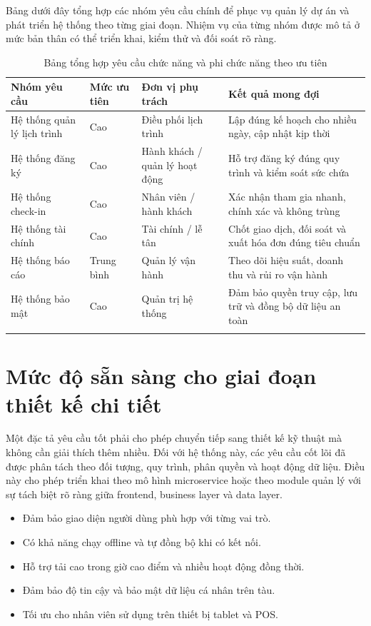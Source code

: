 Bảng dưới đây tổng hợp các nhóm yêu cầu chính để phục vụ quản lý dự án và phát triển hệ thống theo từng giai đoạn. Nhiệm vụ của từng nhóm được mô tả ở mức bản thân có thể triển khai, kiểm thử và đối soát rõ ràng.

\begin{longtable}{|p{2.7cm}|p{3.8cm}|p{3.5cm}|p{4.2cm}|}
\hline
\textbf{Nhóm yêu cầu} & \textbf{Mức ưu tiên} & \textbf{Đơn vị phụ trách} & \textbf{Kết quả mong đợi} \\
\hline
Hệ thống quản lý lịch trình & Cao & Điều phối lịch trình & Lập đúng kế hoạch cho nhiều ngày, cập nhật kịp thời \\
\hline
Hệ thống đăng ký & Cao & Hành khách / quản lý hoạt động & Hỗ trợ đăng ký đúng quy trình và kiểm soát sức chứa \\
\hline
Hệ thống check-in & Cao & Nhân viên / hành khách & Xác nhận tham gia nhanh, chính xác và không trùng \\
\hline
Hệ thống tài chính & Cao & Tài chính / lễ tân & Chốt giao dịch, đối soát và xuất hóa đơn đúng tiêu chuẩn \\
\hline
Hệ thống báo cáo & Trung bình & Quản lý vận hành & Theo dõi hiệu suất, doanh thu và rủi ro vận hành \\
\hline
Hệ thống bảo mật & Cao & Quản trị hệ thống & Đảm bảo quyền truy cập, lưu trữ và đồng bộ dữ liệu an toàn \\
\hline
\caption{Bảng tổng hợp yêu cầu chức năng và phi chức năng theo ưu tiên}
\end{longtable}

\section{Mức độ sẵn sàng cho giai đoạn thiết kế chi tiết}

Một đặc tả yêu cầu tốt phải cho phép chuyển tiếp sang thiết kế kỹ thuật mà không cần giải thích thêm nhiều. Đối với hệ thống này, các yêu cầu cốt lõi đã được phân tách theo đối tượng, quy trình, phân quyền và hoạt động dữ liệu. Điều này cho phép triển khai theo mô hình microservice hoặc theo module quản lý với sự tách biệt rõ ràng giữa frontend, business layer và data layer.

\begin{itemize}
    \item Đảm bảo giao diện người dùng phù hợp với từng vai trò.
    \item Có khả năng chạy offline và tự đồng bộ khi có kết nối.
    \item Hỗ trợ tải cao trong giờ cao điểm và nhiều hoạt động đồng thời.
    \item Đảm bảo độ tin cậy và bảo mật dữ liệu cá nhân trên tàu.
    \item Tối ưu cho nhân viên sử dụng trên thiết bị tablet và POS.
\end{itemize}

